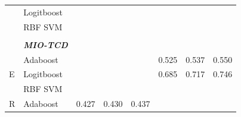 \documentclass[12pt]{article}
\begin{document}
\begin{sloppypar}
\begin{table}[hbt!]
\begin{tabular}{lllllllll}
                                       & \multicolumn{2}{l}{Logitboost}                            &                                 &                                  &                                  &                                 &                                  &                                  \\
                                       & \multicolumn{2}{l}{RBF SVM}                               & \multicolumn{6}{c}{}                                                                                                                                                                                          \\
                                       &                 &                                         &                                 &                                  &                                  &                                 &                                  &                                  \\
                                       & \multicolumn{2}{l}{\textit{\textbf{MIO-TCD}}}             &                                 &                                  &                                  &                                 &                                  &                                  \\
\multirow{3}{*}{E}                     & \multicolumn{2}{l}{Adaboost}                              &                                 &                                  &                                  & 0.525                           & 0.537                            & 0.550                            \\
                                       & \multicolumn{2}{l}{Logitboost}                            &                                 &                                  &                                  & 0.685                           & 0.717                            & 0.746                            \\
                                       & \multicolumn{2}{l}{RBF SVM}                               & \multicolumn{6}{c}{}                                                                                                                                                                                          \\
\multirow{3}{*}{R}                     & \multicolumn{2}{l}{Adaboost}                              & 0.427                           & 0.430                            & 0.437                            &                                 &                                  &                                  \\

\end{tabular}
\end{table}
\end{sloppypar}
\end{document}
